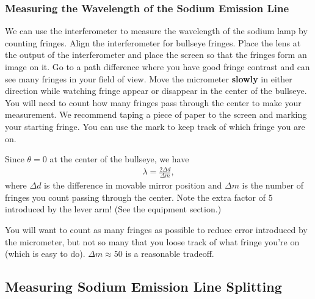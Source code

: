 \documentclass[]{manual}
\begin{document}
    \subsubsection{Measuring the Wavelength of the Sodium Emission Line}

    We can use the interferometer to measure the wavelength of the sodium lamp by counting fringes.
    Align the interferometer for bullseye fringes. Place the lens at the output of the interferometer and place the screen so that the fringes form an image on it.
    Go to a path difference where you have good fringe contrast and can see many fringes in your field of view.
    Move the micrometer \textbf{slowly} in either direction while watching fringe appear or disappear in the center of the bullseye.
    You will need to count how many fringes pass through the center to make your measurement.
    We recommend taping a piece of paper to the screen and marking your starting fringe.
    You can use the mark to keep track of which fringe you are on.

    Since $\theta=0$ at the center of the bullseye, we have
    \begin{align}
        \lambda = \frac{2 \Delta d}{\Delta m},
    \end{align}
    where $\Delta d$ is the difference in movable mirror position and $\Delta m$ is the number of fringes you count passing through the center.
    Note the extra factor of $5$ introduced by the lever arm!
    (See the equipment section.)
    
    You will want to count as many fringes as possible to reduce error introduced by the micrometer, but not so many that you loose track of what fringe you're on (which is easy to do).
    $\Delta m \approx 50$ is a reasonable tradeoff.


    \subsection{Measuring Sodium Emission Line Splitting}
\end{document}
